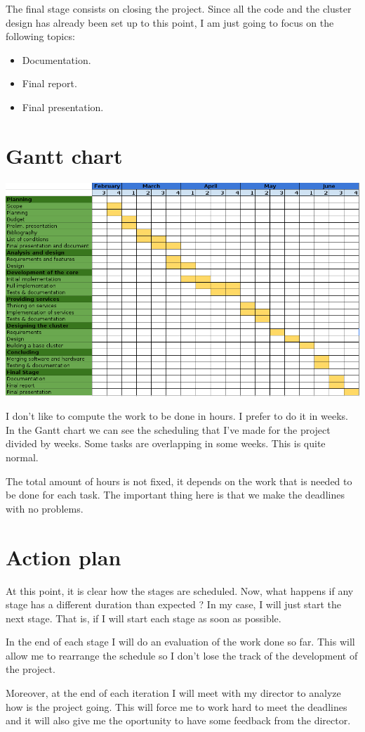 \documentclass[a4paper,12pt]{article}
\newcommand{\mylist}{
\begin{itemize}
\setlength{\itemsep}{1pt}
\setlength{\parskip}{0pt}
\setlength{\parsep}{0pt}}
\newcommand{\mylistend}{\end{itemize}}
\begin{document}
The final stage consists on closing the project. Since all the code and the
cluster design has already been set up to this point, I am just going to focus
on the following topics:

\mylist
  \item Documentation.
  \item Final report.
  \item Final presentation.
\mylistend

\section*{Gantt chart}

\begin{center}
  \hspace*{-2cm}
  \includegraphics[scale=0.75]{images/gantt.png}
\end{center}

I don't like to compute the work to be done in hours. I prefer to do it in
weeks. In the Gantt chart we can see the scheduling that I've made for the
project divided by weeks. Some tasks are overlapping in some weeks. This is
quite normal.

The total amount of hours is not fixed, it depends on the work that is needed
to be done for each task. The important thing here is that we make the
deadlines with no problems.

\section*{Action plan}

At this point, it is clear how the stages are scheduled. Now, what happens if
any stage has a different duration than expected ? In my case, I will just
start the next stage. That is, if I will start each stage as soon as possible.

In the end of each stage I will do an evaluation of the work done so far. This
will allow me to rearrange the schedule so I don't lose the track of the
development of the project.

Moreover, at the end of each iteration I will meet with my director to analyze
how is the project going. This will force me to work hard to meet the deadlines
and it will also give me the oportunity to have some feedback from the director.
\end{document}
